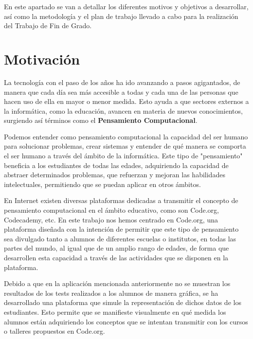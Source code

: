 
En este apartado se van a detallar los diferentes motivos y objetivos a desarrollar, así como la metodología y el plan de trabajo llevado a cabo para la realización del Trabajo de Fin de Grado.

\section{Motivación}
\label{1:sec:1}

La tecnología con el paso de los años ha ido avanzando a pasos agigantados, de manera que cada día sea más accesible a todas y cada una de las personas que hacen uso de ella en mayor o menor medida. Esto ayuda a que sectores externos a la informática, como la educación, avancen en materia de nuevos conocimientos,
surgiendo así términos como el \textbf{Pensamiento Computacional}.

Podemos entender como pensamiento computacional la capacidad del ser humano para solucionar problemas, crear sistemas y entender de qué manera se comporta el ser humano a través del ámbito de la informática. Este tipo de "pensamiento" beneficia a los estudiantes de todas las edades, adquiriendo la capacidad de abstraer determinados
problemas, que refuerzan y mejoran las habilidades intelectuales, permitiendo que se puedan aplicar en otros ámbitos.

En Internet existen diversas plataformas dedicadas a transmitir el concepto de pensamiento computacional en el ámbito educativo, como son Code.org\cite{Code.org}, Codecademy\cite{Codecademy}, etc. En este trabajo nos hemos centrado en Code.org, una plataforma diseñada con la intención de permitir que este tipo de pensamiento sea divulgado tanto a alumnos de diferentes
escuelas o institutos, en todas las partes del mundo, al igual que de un amplio rango de edades, de forma que desarrollen esta capacidad a través de las actividades que se disponen en la plataforma.

Debido a que en la aplicación mencionada anteriormente no se muestran los resultados de los tests realizados a los alumnos de manera gráfica, se ha desarrollado una plataforma que simule la representación de dichos datos de los estudiantes. Esto permite que se manifieste visualmente en qué medida los alumnos están adquiriendo los conceptos
que se intentan transmitir con los cursos o talleres propuestos en Code.org. 

